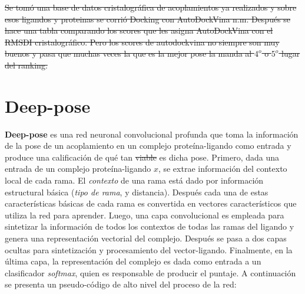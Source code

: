 \sout{Se tomó una base de datos cristalográfica de acoplamientos ya
realizados y sobre esos ligandos y proteinas se corrió Docking con
AutoDockVina n.m. Después se hace una tabla comparando los scores que
les asigna AutoDockVina con el RMSDI cristalográfico. Pero los scores
de autodockvina no siempre son muy buenos y pasa que muchas veces la
que es la mejor pose la manda al $4^o$ o $5^o$ lugar del ranking.}

\section{Deep-pose}
\textbf{Deep-pose} es una red neuronal convolucional profunda que toma
la información de la pose de un acoplamiento en un complejo
proteína-ligando como entrada y produce una calificación de qué tan
\sout{viable} es dicha pose.  Primero, dada una entrada de un complejo
proteína-ligando $x$, se extrae información del contexto local de cada
rama. El \textit{contexto} de una rama está dado por información
estructural básica (\textit{tipo de rama}, y distancia). Después cada
una de estas características básicas de cada rama es convertida en
vectores característicos que utiliza la red para aprender. Luego, una
capa convolucional es empleada para sintetizar la información de todos
los contextos de todas las ramas del ligando y genera una
representación vectorial del complejo. Después se pasa a dos capas
ocultas para sintetización y procesamiento del
vector-ligando. Finalmente, en la última capa, la representación del
complejo es dada como entrada a un clasificador \textit{softmax},
quien es responsable de producir el puntaje. A continuación se
presenta un pseudo-código de alto nivel del proceso de la red:
